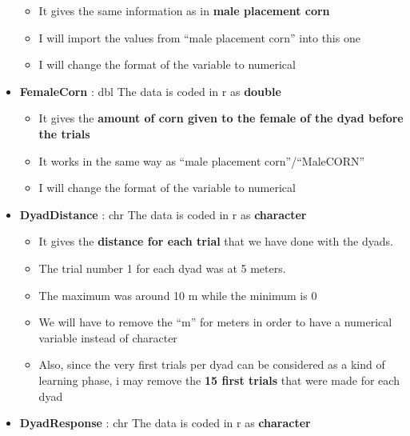 \documentclass[
]{article}
\providecommand{\tightlist}{%
  \setlength{\itemsep}{0pt}\setlength{\parskip}{0pt}}
\begin{document}
\begin{itemize}
  \begin{itemize}
  \tightlist
  \item
    It gives the same information as in \textbf{male placement corn}
  \item
    I will import the values from ``male placement corn'' into this one
  \item
    I will change the format of the variable to numerical
  \end{itemize}
\item
  \textbf{FemaleCorn} : dbl The data is coded in r as \textbf{double}

  \begin{itemize}
  \tightlist
  \item
    It gives the \textbf{amount of corn given to the female of the dyad
    before the trials}
  \item
    It works in the same way as ``male placement corn''/``MaleCORN''
  \item
    I will change the format of the variable to numerical
  \end{itemize}
\item
  \textbf{DyadDistance} : chr The data is coded in r as
  \textbf{character}

  \begin{itemize}
  \tightlist
  \item
    It gives the \textbf{distance for each trial} that we have done with
    the dyads.
  \item
    The trial number 1 for each dyad was at 5 meters.
  \item
    The maximum was around 10 m while the minimum is 0
  \item
    We will have to remove the ``m'' for meters in order to have a
    numerical variable instead of character
  \item
    Also, since the very first trials per dyad can be considered as a
    kind of learning phase, i may remove the \textbf{15 first trials}
    that were made for each dyad
  \end{itemize}
\item
  \textbf{DyadResponse} : chr The data is coded in r as
  \textbf{character}


\end{itemize}
\end{document}
